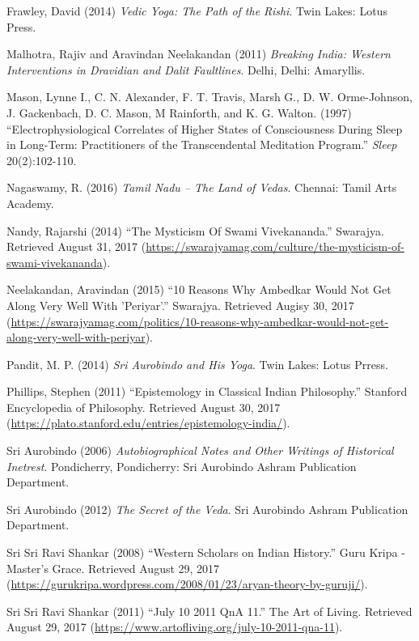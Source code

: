 \begin{thebibliography}{99}
  Frawley, David (2014) \textit{Vedic Yoga: The Path of the Rishi}. Twin Lakes: Lotus Press.

  Malhotra, Rajiv and Aravindan Neelakandan (2011) \textit{Breaking India: Western Interventions in Dravidian and Dalit Faultlines}. Delhi, Delhi: Amaryllis.

  Mason, Lynne I., C. N. Alexander, F. T. Travis, Marsh G., D. W. Orme-Johnson, J. Gackenbach, D. C. Mason, M Rainforth, and K. G. Walton. (1997) “Electrophysiological Correlates of Higher States of Consciousness During Sleep in Long-Term: Practitioners of the Transcendental Meditation Program.” \textit{Sleep} 20(2):102-110.

  Nagaswamy, R. (2016) \textit{Tamil Nadu – The Land of Vedas}. Chennai: Tamil Arts Academy.

  Nandy, Rajarshi (2014) “The Mysticism Of Swami Vivekananda.” Swarajya. Retrieved August 31, 2017 (\url{https://swarajyamag.com/culture/the-mysticism-of-swami-vivekananda}).

  Neelakandan, Aravindan (2015) “10 Reasons Why Ambedkar Would Not Get Along Very Well With 'Periyar'.” Swarajya. Retrieved Augisy 30, 2017 (\url{https://swarajyamag.com/politics/10-reasons-why-ambedkar-would-not-get-along-very-well-with-periyar}).

  Pandit, M. P. (2014) \textit{Sri Aurobindo and His Yoga}. Twin Lakes: Lotus Prress.

  Phillips, Stephen (2011) “Epistemology in Classical Indian Philosophy.” Stanford Encyclopedia of Philosophy. Retrieved August 30, 2017 (\url{https://plato.stanford.edu/entries/epistemology-india/}).

  Sri Aurobindo (2006) \textit{Autobiographical Notes and Other Writings of Historical Inetrest}. Pondicherry, Pondicherry: Sri Aurobindo Ashram Publication Department.

  Sri Aurobindo (2012) \textit{The Secret of the Veda}. Sri Aurobindo Ashram Publication Department.

  Sri Sri Ravi Shankar (2008) “Western Scholars on Indian History.” Guru Kripa - Master's Grace. Retrieved August 29, 2017 (\url{https://gurukripa.wordpress.com/2008/01/23/aryan-theory-by-guruji/}).

  Sri Sri Ravi Shankar (2011) “July 10 2011 QnA 11.” The Art of Living. Retrieved August 29, 2017 (\url{https://www.artofliving.org/july-10-2011-qna-11}).


\end{thebibliography}
